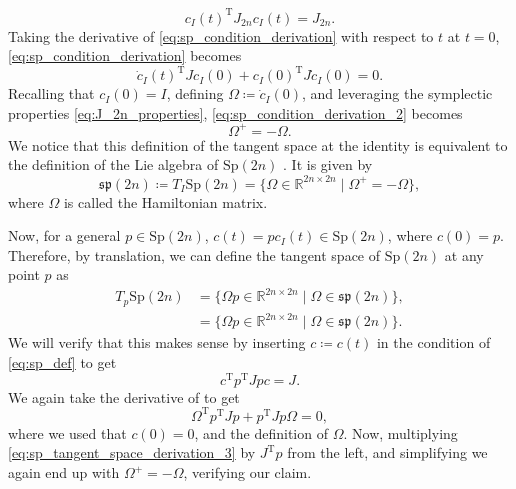 %
\begin{equation}\label{eq:sp_condition_derivation}
c_{I}(t)^{\mathrm{T}}J_{2n}c_{I}(t)=J_{2n}.
\end{equation}
%
Taking the derivative of \eqref{eq:sp_condition_derivation} with respect to $t$ at $t=0$, \eqref{eq:sp_condition_derivation} becomes 
%
\begin{equation}\label{eq:sp_condition_derivation_2}
\dot{c}_{I}(t)^{\mathrm{T}}Jc_{I}(0)+c_{I}(0)^{\mathrm{T}}J \dot{c}_{I}(0)=0.
\end{equation}
%
Recalling that $c_{I}(0)=I$, defining $\Omega \coloneqq \dot{c}_{I}(0)$, and leveraging the symplectic properties \eqref{eq:J_2n_properties}, \eqref{eq:sp_condition_derivation_2} becomes
%
\begin{equation*}
\Omega^{+}=-\Omega.
\end{equation*}
%
We notice that this definition of the tangent space at the identity is equivalent to the definition of the Lie algebra of $\mathrm{Sp}(2n)$ \cite[p.~3]{BendokatZimmermann2021}. It is given by 
%
\begin{equation}\label{eq:sp_Lie_algebra}
    \mathfrak{sp}(2n)\coloneqq T_{I}\mathrm{Sp}(2n)=\{\Omega\in \mathbb{R}^{2n\times2n} \;|\; \Omega^{+}=-\Omega\},
\end{equation}
%
where $\Omega$ is called the Hamiltonian matrix. 

Now, for a general $p \in \mathrm{Sp}(2n)$, $c(t)=pc_{I}(t)\in \mathrm{Sp}(2n)$, where $c(0)=p$. Therefore, by translation, we can define the tangent space of $\mathrm{Sp}(2n)$ at any point $p$  as
%
\begin{equation}\label{eq:sp_tangent_space}
\begin{split}
T_{p}\mathrm{Sp}(2n)&=\{\Omega p\in \mathbb{R}^{2n\times2n} \;|\; \Omega\in\mathfrak{sp}(2n)\},\\
&=\{\Omega p\in \mathbb{R}^{2n\times2n} \;|\; \Omega\in\mathfrak{sp}(2n)\}.
\end{split}
\end{equation}
%
We will verify that this makes sense by inserting $c\coloneqq c(t)$ in the condition of \eqref{eq:sp_def} to get
%
\begin{equation*}
c^{\mathrm{T}}p^{\mathrm{T}}Jpc=J.
\end{equation*}
%
We again take the derivative of to get
%
\begin{equation}\label{eq:sp_tangent_space_derivation_3}
\Omega ^{\mathrm{T}}p^{\mathrm{T}}Jp+p^{\mathrm{T}}Jp\Omega=0,
\end{equation}
where we used that $c(0)=0$, and the definition of $\Omega$. Now, multiplying \eqref{eq:sp_tangent_space_derivation_3} by $J^{\mathrm{T}}p$ from the left, and simplifying we again end up with $\Omega^{+}=-\Omega$, verifying our claim.

